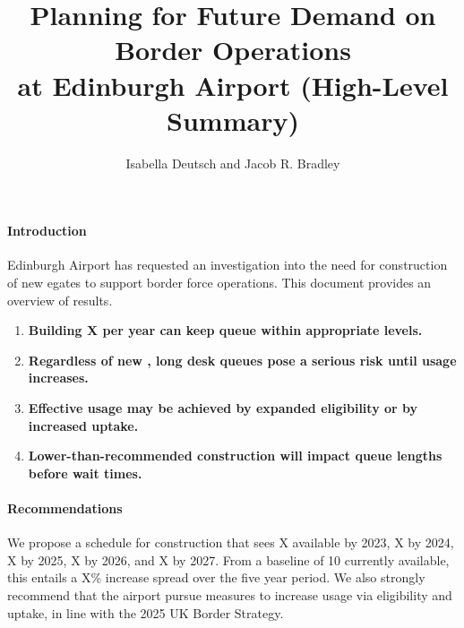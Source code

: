 \documentclass[10pt]{article}
\title{Planning for Future Demand on Border Operations\\ at Edinburgh Airport (High-Level Summary)}
\author{Isabella Deutsch and Jacob R. Bradley}
\date{}
\begin{document}
\maketitle
\thispagestyle{empty}

\vspace{-15pt}
\paragraph{Introduction}
Edinburgh Airport has requested an investigation into the need for construction of new \glspl{egate} to support border force operations. This document provides an overview of results.
\begin{tcolorbox}[
colframe=edi-dark-purple,
colback=edi-light-purple,
fonttitle=\bfseries,
title = {Report Highlights}]
\begin{enumerate}[itemsep=-1ex]

    \item \textbf{Building X  per year can keep  queue  within appropriate levels.}\\
    \item \textbf{Regardless of new , long desk queues pose a serious risk until  usage increases.}\\
    \item \textbf{Effective  usage may be achieved by expanded eligibility or by increased uptake.}\\
    \item \textbf{Lower-than-recommended  construction will impact queue lengths before wait times.}
\end{enumerate}
\end{tcolorbox}
\paragraph{Recommendations}
We propose a schedule for  construction that sees X  available by 2023, X by 2024, X by 2025, X by 2026, and X by 2027. From a baseline of 10  currently available, this entails a X\% increase spread over the five year period. We also strongly recommend that the airport pursue measures to increase  usage via eligibility and uptake, in line with the 2025 UK Border Strategy. 
\end{document}
